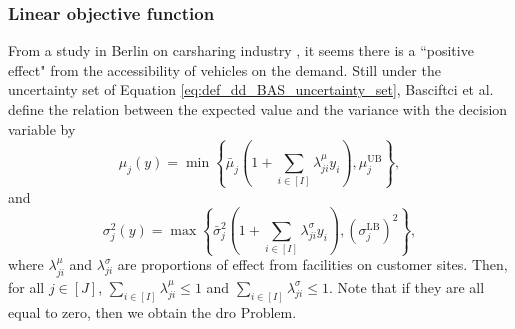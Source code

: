 \documentclass[12pt, letterpaper]{article}
\begin{document}
	\subsubsection{Linear objective function}
	From a study in Berlin on carsharing industry \cite{ciari_modeling_2014}, it seems there is a ``positive effect" from the accessibility of vehicles on the demand. Still under the uncertainty set of Equation \eqref{eq:def_dd_BAS_uncertainty_set}, Basciftci et al. define the relation between the expected value and the variance with the decision variable by
	\begin{equation} \label{eq:def_BAS_muy}
		\mu_j(y) = \min\left\{\bar{\mu}_j \left(1 + \sum_{i \in [I]} \lambda_{ji}^\mu y_i\right), \mu_j^{\mathrm{UB}}\right\},
	\end{equation}
	and
	\begin{equation} \label{eq:def_BAS_sigy}
		\sigma_j^2(y) = \max\left\{\bar{\sigma}_j^2 \left(1 + \sum_{i \in [I]} \lambda_{ji}^\sigma y_i\right), (\sigma_j^{\mathrm{LB}})^2\right\},
	\end{equation}
	where $\lambda_{j i}^\mu$ and $\lambda_{j i}^\sigma$ are proportions of effect from facilities on customer sites. Then, for all $j \in [J]$, $\sum_{i \in [I]} \lambda_{j i}^\mu \le 1$ and $\sum_{i \in [I]} \lambda_{j i}^\sigma \le 1$. Note that if they are all equal to zero, then we obtain the \gls{dro} Problem.
	
\end{document}
